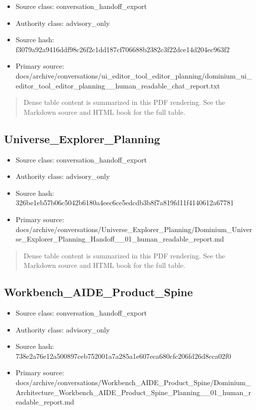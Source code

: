 \documentclass[11pt,a4paper]{report}
\begin{document}
\begin{itemize}
\item Source class: conversation\_handoff\_export
\item Authority class: advisory\_only
\item Source hash: f3079a92a9416ddf98c26f2c1dd187cf706688b2382c3f22dce14d204ec963f2
\item Primary source: docs/archive/conversations/ui\_editor\_tool\_editor\_planning/dominium\_ui\_editor\_tool\_editor\_planning\_\_human\_readable\_chat\_report.txt
\end{itemize}

\begin{quote}\small Dense table content is summarized in this PDF rendering. See the Markdown source and HTML book for the full table.\end{quote}

\subsection{Universe\_Explorer\_Planning}

\begin{itemize}
\item Source class: conversation\_handoff\_export
\item Authority class: advisory\_only
\item Source hash: 326be1eb57b06c5042b6180a4eec6ce5edcdb3b8f7a819fd11f4140612a67781
\item Primary source: docs/archive/conversations/Universe\_Explorer\_Planning/Dominium\_Universe\_Explorer\_Planning\_Handoff\_\_01\_human\_readable\_report.md
\end{itemize}

\begin{quote}\small Dense table content is summarized in this PDF rendering. See the Markdown source and HTML book for the full table.\end{quote}

\subsection{Workbench\_AIDE\_Product\_Spine}

\begin{itemize}
\item Source class: conversation\_handoff\_export
\item Authority class: advisory\_only
\item Source hash: 738e2a76e12a500897ceb752001a7a285a1e607eca680cfc206fd26d8cca02f0
\item Primary source: docs/archive/conversations/Workbench\_AIDE\_Product\_Spine/Dominium\_Architecture\_Workbench\_AIDE\_Product\_Spine\_Planning\_\_01\_human\_readable\_report.md
\end{itemize}
\end{document}

